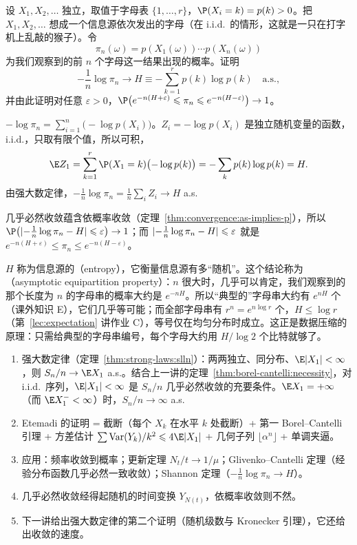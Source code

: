 \begin{workedexample}\label{we:strong-laws:shannon}
设 $X_1,X_2,\dots$ 独立，取值于字母表 $\{1,\dots,r\}$，$\P(X_i=k)=p(k)>0$。把 $X_1,X_2,\dots$ 想成一个信息源依次发出的字母（在 i.i.d.\ 的情形，这就是一只在打字机上乱敲的猴子）。令
\[
\pi_n(\omega)=p(X_1(\omega))\cdots p(X_n(\omega))
\]
为我们观察到的前 $n$ 个字母这一结果出现的概率。证明
\[
-\frac1n\log\pi_n\to H\equiv-\sum_{k=1}^rp(k)\log p(k)\quad\text{a.s.},
\]
并由此证明对任意 $\varepsilon>0$，$\P\bigl(e^{-n(H+\varepsilon)}\leqslant\pi_n\leqslant e^{-n(H-\varepsilon)}\bigr)\to1$。
\end{workedexample}
\begin{solution}
$-\log\pi_n=\sum_{i=1}^n\bigl(-\log p(X_i)\bigr)$。$Z_i=-\log p(X_i)$ 是独立随机变量的函数，i.i.d.，只取有限个值，所以可积，
\[
\E Z_1=\sum_{k=1}^r\P(X_1=k)\bigl(-\log p(k)\bigr)=-\sum_kp(k)\log p(k)=H .
\]
由强大数定律，$-\frac1n\log\pi_n=\frac1n\sum_iZ_i\to H$ a.s.

几乎必然收敛蕴含依概率收敛（定理~\ref{thm:convergence:as-implies-p}），所以 $\P\bigl(\abs{-\frac1n\log\pi_n-H}\leqslant\varepsilon\bigr)\to1$；而 $\lvert -\frac1n\log\pi_n-H\rvert\leqslant\varepsilon$ 就是 $e^{-n(H+\varepsilon)}\leqslant\pi_n\leqslant e^{-n(H-\varepsilon)}$。

$H$ 称为信息源的（entropy），它衡量信息源有多“随机”。这个结论称为（asymptotic equipartition property）：$n$ 很大时，几乎可以肯定，我们观察到的那个长度为 $n$ 的字母串的概率大约是 $e^{-nH}$。所以“典型的”字母串大约有 $e^{nH}$ 个（课外知识 E），它们几乎等可能；而全部字母串有 $r^n=e^{n\log r}$ 个，$H\leqslant\log r$（第~\ref{lec:expectation} 讲作业 C），等号仅在均匀分布时成立。这正是数据压缩的原理：只需给典型的字母串编号，每个字母大约用 $H/\log2$ 个比特就够了。
\end{solution}


\begin{enumerate}
\item 强大数定律（定理~\ref{thm:strong-laws:slln}）：两两独立、同分布、$\E\abs{X_1}<\infty$，则 $S_n/n\to \E X_1$ a.s.。结合上一讲的定理~\ref{thm:borel-cantelli:necessity}，对 i.i.d.\ 序列，$\E\abs{X_1}<\infty$ 是 $S_n/n$ 几乎必然收敛的充要条件。$\E X_1=+\infty$（而 $\E X_1^-<\infty$）时，$S_n/n\to\infty$ a.s.
\item Etemadi 的证明 = 截断（每个 $X_k$ 在水平 $k$ 处截断）+ 第一 Borel--Cantelli 引理 + 方差估计 $\sum\Var(Y_k)/k^2\leqslant4\E\abs{X_1}$ + 几何子列 $\lfloor\alpha^n\rfloor$ + 单调夹逼。
\item 应用：频率收敛到概率；更新定理 $N_t/t\to1/\mu$；Glivenko--Cantelli 定理（经验分布函数几乎必然一致收敛）；Shannon 定理（$-\frac1n\log\pi_n\to H$）。
\item 几乎必然收敛经得起随机的时间变换 $Y_{N(t)}$，依概率收敛则不然。
\item 下一讲给出强大数定律的第二个证明（随机级数与 Kronecker 引理），它还给出收敛的速度。
\end{enumerate}

